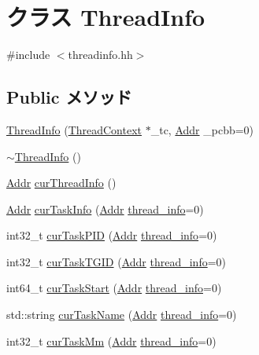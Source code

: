 \hypertarget{classLinux_1_1ThreadInfo}{
\section{クラス ThreadInfo}
\label{classLinux_1_1ThreadInfo}
}


{\ttfamily \#include $<$threadinfo.hh$>$}\subsection*{Public メソッド}
\begin{DoxyCompactItemize}
\item 
\hyperlink{classLinux_1_1ThreadInfo_ac45ecf2813a7b8622615eb399e4ef8d7}{ThreadInfo} (\hyperlink{classThreadContext}{ThreadContext} $\ast$\_\-tc, \hyperlink{base_2types_8hh_af1bb03d6a4ee096394a6749f0a169232}{Addr} \_\-pcbb=0)
\item 
\hyperlink{classLinux_1_1ThreadInfo_a4eb41aa67f0202861fc2a3862127964e}{$\sim$ThreadInfo} ()
\item 
\hyperlink{base_2types_8hh_af1bb03d6a4ee096394a6749f0a169232}{Addr} \hyperlink{classLinux_1_1ThreadInfo_a858f183600a76216a02ed8118d784cdc}{curThreadInfo} ()
\item 
\hyperlink{base_2types_8hh_af1bb03d6a4ee096394a6749f0a169232}{Addr} \hyperlink{classLinux_1_1ThreadInfo_a1a8fccfe3891a5949b7acbf68d210165}{curTaskInfo} (\hyperlink{base_2types_8hh_af1bb03d6a4ee096394a6749f0a169232}{Addr} \hyperlink{structLinux_1_1thread__info}{thread\_\-info}=0)
\item 
int32\_\-t \hyperlink{classLinux_1_1ThreadInfo_a61cccca364818b8d499410a9b100d307}{curTaskPID} (\hyperlink{base_2types_8hh_af1bb03d6a4ee096394a6749f0a169232}{Addr} \hyperlink{structLinux_1_1thread__info}{thread\_\-info}=0)
\item 
int32\_\-t \hyperlink{classLinux_1_1ThreadInfo_a95f8711d141a94ab8f2b192bb58d6fc1}{curTaskTGID} (\hyperlink{base_2types_8hh_af1bb03d6a4ee096394a6749f0a169232}{Addr} \hyperlink{structLinux_1_1thread__info}{thread\_\-info}=0)
\item 
int64\_\-t \hyperlink{classLinux_1_1ThreadInfo_aa1fc5d282b28d10354417f72a82a36c7}{curTaskStart} (\hyperlink{base_2types_8hh_af1bb03d6a4ee096394a6749f0a169232}{Addr} \hyperlink{structLinux_1_1thread__info}{thread\_\-info}=0)
\item 
std::string \hyperlink{classLinux_1_1ThreadInfo_a35e25daf337cac7b44d13cf92382f45e}{curTaskName} (\hyperlink{base_2types_8hh_af1bb03d6a4ee096394a6749f0a169232}{Addr} \hyperlink{structLinux_1_1thread__info}{thread\_\-info}=0)
\item 
int32\_\-t \hyperlink{classLinux_1_1ThreadInfo_a9e35eef467b5e80427937e62772c91da}{curTaskMm} (\hyperlink{base_2types_8hh_af1bb03d6a4ee096394a6749f0a169232}{Addr} \hyperlink{structLinux_1_1thread__info}{thread\_\-info}=0)
\end{DoxyCompactItemize}
